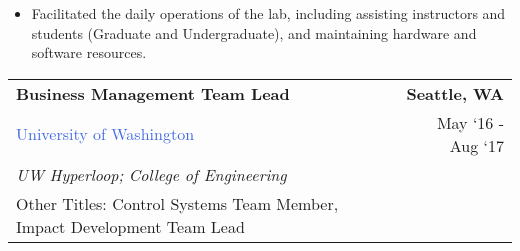 \documentclass[10pt]{article}
\newcommand{\highlightcolor}{RoyalBlue}
\newcommand{\tabularxwidth}{\textwidth}
\begin{document}
\begin{minipage}{\tabularxwidth}
\begin{itemize}[noitemsep, topsep=3pt, parsep=0pt, partopsep=0pt]
                \item 
    Facilitated the daily operations of the lab, including assisting instructors and students (Graduate and Undergraduate), and maintaining hardware and software resources.
            
        \end{itemize}

        
            \vspace{.5em}
        

    \end{minipage}
    
    \begin{minipage}{\tabularxwidth}

        \begin{tabularx}{\tabularxwidth}{X r}
            \textbf{Business Management Team Lead} & \textbf{Seattle, 
        WA} \\
            
    
    
    

    
        \textcolor{\highlightcolor}{University of Washington} & 
        
    May ‘16 - 
    Aug ‘17 \\
        
            \textit{UW Hyperloop;}
                \textit{College of Engineering} & \\
        
    
            
                Other Titles: Control Systems Team Member, Impact Development Team Lead & \\
            
        \end{tabularx}

        \begin{itemize}[noitemsep, topsep=3pt, parsep=0pt, partopsep=0pt]
            

\end{itemize}
\end{minipage}
\end{document}
